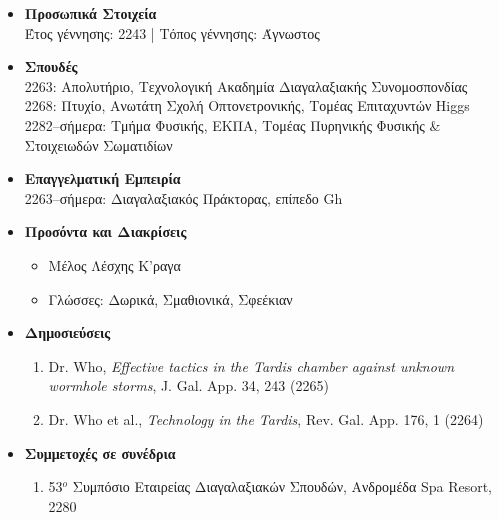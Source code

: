 \large
{}
\normalsize

\begin{itemize}

\item
{\bf Προσωπικά Στοιχεία}\\
Έτος γέννησης: 2243 | Τόπος γέννησης: Άγνωστος

\item
{\bf Σπουδές}\\
2263: Απολυτήριο, Τεχνολογική Ακαδημία Διαγαλαξιακής Συνομοσπονδίας\\
2268: Πτυχίο, Ανωτάτη Σχολή Οπτονετρονικής, Τομέας Επιταχυντών Higgs\\
2282--σήμερα: Τμήμα Φυσικής, ΕΚΠΑ, Τομέας Πυρηνικής Φυσικής \& Στοιχειωδών Σωματιδίων

\item
{\bf Επαγγελματική Εμπειρία}\\
2263--σήμερα: Διαγαλαξιακός Πράκτορας, επίπεδο Gh

\item
{\bf Προσόντα και Διακρίσεις}
	\begin{itemize}
	\item
	Μέλος Λέσχης Κ'ραγα
	\item
	Γλώσσες: Δωρικά, Σμαθιονικά, Σφεέκιαν
	\end{itemize}
\item
{\bf Δημοσιεύσεις}
	\begin{enumerate}
	\item
	Dr. Who, {\em Effective tactics in the Tardis chamber against unknown wormhole storms}, J. Gal. App. 34, 243 (2265)
	\item
	Dr. Who et al., {\em Technology in the Tardis}, Rev. Gal. App. 176, 1 (2264)
	\end{enumerate}

\item
{\bf Συμμετοχές σε συνέδρια}
	\begin{enumerate}
	\item
	53$^o$ Συμπόσιο Εταιρείας Διαγαλαξιακών Σπουδών, Ανδρομέδα Spa Resort, 2280
	\end{enumerate}
\end{itemize}
